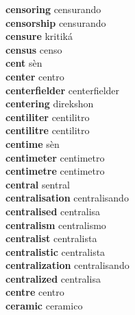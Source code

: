\textbf{censoring } censurando \\
\textbf{censorship } censurando \\
\textbf{censure } kritiká \\
\textbf{census } censo \\
\textbf{cent } sèn \\
\textbf{center } centro \\
\textbf{centerfielder } centerfielder \\
\textbf{centering } direkshon \\
\textbf{centiliter } centilitro \\
\textbf{centilitre } centilitro \\
\textbf{centime } sèn \\
\textbf{centimeter } centimetro \\
\textbf{centimetre } centimetro \\
\textbf{central } sentral \\
\textbf{centralisation } centralisando \\
\textbf{centralised } centralisa \\
\textbf{centralism } centralismo \\
\textbf{centralist } centralista \\
\textbf{centralistic } centralista \\
\textbf{centralization } centralisando \\
\textbf{centralized } centralisa \\
\textbf{centre } centro \\
\textbf{ceramic } ceramico \\
